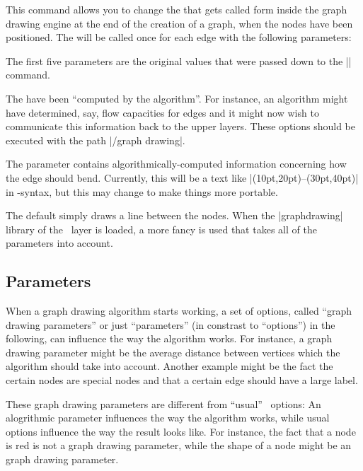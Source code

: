 \begin{command}{\pgfgdsetedgecallback{}}
  This command allows you to change the  that gets called
  form inside the graph drawing engine at the end of the creation of a
  graph, when the nodes have been positioned. The  will be 
  called once for each edge with the following parameters:
  \begin{quote}
  \end{quote}

  The first five parameters are the original values that were passed
  down to the |\pgfgdedge| command.
  
  The  have been ``computed by the
  algorithm''. For instance, an algorithm might have determined, say,
  flow capacities for edges and it might now wish to communicate this
  information back to the upper layers. These options should be
  executed with the path |/graph drawing|.
  
  The parameter  contains
  algorithmically-computed information concerning how the 
  edge should bend. Currently, this will be a text like
  |(10pt,20pt)--(30pt,40pt)| in \tikzname-syntax, but this may change
  to make things more portable.

  The default  simply draws a line between the nodes. When
  the |graphdrawing| library of the \tikzname\ layer is loaded, a more
  fancy  is used that takes all of the parameters into
  account.
\end{command}


\subsection{Parameters}
\label{section-gd-parameters}

When a graph drawing algorithm starts working, a set of options,
called ``graph drawing parameters'' or just ``parameters'' (in
constrast to ``options'') in the following, can influence
the way the algorithm works. For instance, a graph drawing parameter
might be the average distance between vertices which the algorithm
should take into account. Another example might be the fact the
certain nodes are special nodes and that a certain edge should have
a large label.

These graph drawing parameters are different from ``usual'' \pgfname\
options: An alogrithmic parameter influences the way the algorithm
works, while usual options influence the way the result
looks like. For instance, the fact that a node is red is not a
graph drawing parameter, while the shape of a node might be an graph
drawing parameter. 


